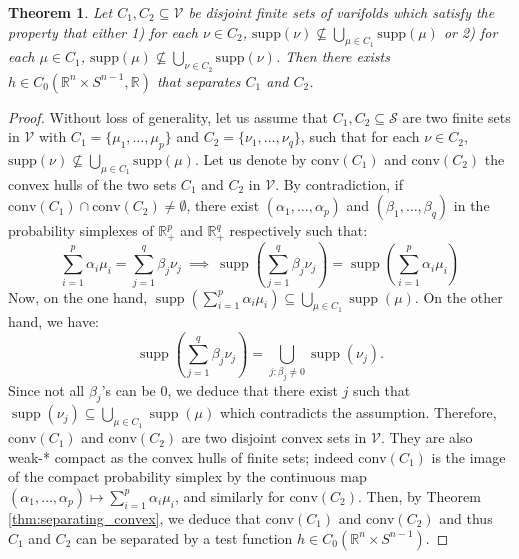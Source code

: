 \documentclass[11pt]{article}
\newtheorem{thm}{Theorem}
\newcommand{\R}{\mathbb{R}}
\begin{document}
\begin{thm}\label{thm:separating_support}
    Let $C_1, C_2 \subseteq \mathcal{V}$ be disjoint finite sets of varifolds which satisfy the property that either 1) for each $\nu \in C_2$, $\text{supp}(\nu)\not\subseteq \bigcup_{\mu\in C_1} \text{supp}(\mu)$ or 2) for each $\mu \in C_1$, $\text{supp}(\mu)\not\subseteq \bigcup_{\nu\in C_2} \text{supp}(\nu)$. Then there exists $h\in C_0(\R^n\times S^{n-1},\R)$ that separates $C_1$ and $C_2$.
\end{thm}
\begin{proof}
Without loss of generality, let us assume that $C_1, C_2 \subseteq \mathcal{S}$ are two finite sets in $\mathcal{V}$ with $C_1=\{\mu_1,\ldots,\mu_p\}$ and $C_2=\{\nu_1,\ldots,\nu_q\}$, such that for each $\nu \in C_2$, $\text{supp}(\nu)\not\subseteq \bigcup_{\mu\in C_1} \text{supp}(\mu)$. Let us denote by $\text{conv}(C_1)$ and $\text{conv}(C_2)$ the convex hulls of the two sets $C_1$ and $C_2$ in $\mathcal{V}$. By contradiction, if $\text{conv}(C_1) \cap \text{conv}(C_2) \neq \emptyset$, there exist $(\alpha_1,\ldots,\alpha_p)$ and $(\beta_1,\ldots,\beta_q)$ in the probability simplexes of $\R^p_+$ and $\R_+^q$ respectively such that:   
\begin{equation*}
    \sum_{i=1}^p \alpha_i \mu_i = \sum_{j=1}^{q} \beta_j \nu_j \ \implies \ \operatorname{supp}\left(\sum_{j=1}^{q} \beta_j \nu_j \right) = \operatorname{supp}\left(\sum_{i=1}^{p} \alpha_i \mu_i \right)
\end{equation*}
Now, on the one hand, $\operatorname{supp}\left(\sum_{i=1}^{p} \alpha_i \mu_i \right) \subseteq \bigcup_{\mu \in C_1} \operatorname{supp}(\mu)$. On the other hand, we have:
\begin{equation*}
    \operatorname{supp}\left(\sum_{j=1}^{q} \beta_j \nu_j \right) = \bigcup_{j:\beta_j \neq 0} \operatorname{supp}(\nu_j).
\end{equation*}
Since not all $\beta_j$'s can be $0$, we deduce that there exist $j$ such that $\operatorname{supp}(\nu_j) \subseteq \bigcup_{\mu \in C_1} \operatorname{supp}(\mu)$ which contradicts the assumption. Therefore, $\text{conv}(C_1)$ and $\text{conv}(C_2)$ are two disjoint convex sets in $\mathcal{V}$. They are also weak-* compact as the convex hulls of finite sets; indeed $\text{conv}(C_1)$ is the image of the compact probability simplex by the continuous map $(\alpha_1,\ldots,\alpha_p) \mapsto \sum_{i=1}^p \alpha_i \mu_i$, and similarly for $\text{conv}(C_2)$. Then, by Theorem \ref{thm:separating_convex}, we deduce that $\text{conv}(C_1)$ and $\text{conv}(C_2)$ and thus $C_1$ and $C_2$ can be separated by a test function $h \in C_0(\R^n\times S^{n-1})$.
\end{proof}
\end{document}
